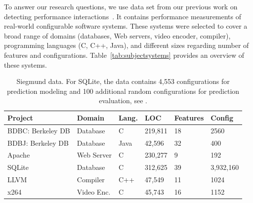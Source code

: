 \documentclass{sig-alternative}
\begin{document}
To answer our research questions, we use data set from our previous work on detecting performance interactions~\cite{SKR+12}. It contains performance measurements of real-world configurable software systems. These systems were selected to cover a broad range of domains (databases, Web servers, video encoder, compiler), programming languages (C, C++, Java), and different sizes regarding number of features and configurations. Table~\ref{tab:subjectsystems} provides an overview of these systems.
 
 \begin{table}[!t]
\scriptsize
\begin{tabular}{llllll}
  \hline
Project & Domain & Lang. & LOC & Features & Config\\\hline
BDBC: Berkeley DB   & Database & C & 219,811 & 18 & 2560\\
BDBJ: Berkeley DB   & Database & Java & 42,596 & 32  & 400\\
Apache & Web Server & C & 230,277 & 9 & 192\\
SQLite & Database & C & 312,625 & 39 & 3,932,160\\
LLVM & Compiler & C++ & 47,549 & 11 & 1024\\
x264 & Video Enc. & C& 45,743 & 16 & 1152\\\hline
\end{tabular}
 \label{tab:subjectsystems}
\caption{Siegmund data.
For SQLite, the data  contains 4,553 configurations for prediction modeling and 100 additional random configurations for prediction evaluation, see \cite{vapp}.}\label{fig:cpm}
\end{table}
\end{document}
